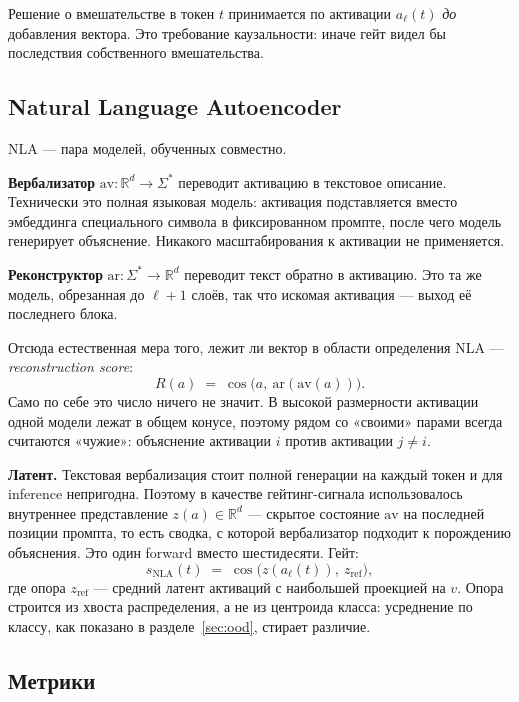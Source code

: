 \documentclass[11pt,a4paper]{article}
\begin{document}
Решение о вмешательстве в токен $t$ принимается по активации $a_\ell(t)$
\emph{до} добавления вектора. Это требование каузальности: иначе гейт видел бы
последствия собственного вмешательства.

\subsection{Natural Language Autoencoder}

NLA --- пара моделей, обученных совместно.

\textbf{Вербализатор} $\mathrm{av}:\mathbb{R}^d\to\Sigma^{*}$ переводит
активацию в текстовое описание. Технически это полная языковая модель:
активация подставляется вместо эмбеддинга специального символа в фиксированном
промпте, после чего модель генерирует объяснение. Никакого масштабирования к
активации не применяется.

\textbf{Реконструктор} $\mathrm{ar}:\Sigma^{*}\to\mathbb{R}^d$ переводит текст
обратно в активацию. Это та же модель, обрезанная до $\ell+1$ слоёв, так что
искомая активация --- выход её последнего блока.

Отсюда естественная мера того, лежит ли вектор в области определения NLA ---
\emph{reconstruction score}:
\begin{equation}
R(a) \;=\; \cos\!\big(a,\ \mathrm{ar}(\mathrm{av}(a))\big).
\label{eq:recon}
\end{equation}
Само по себе это число ничего не значит. В высокой размерности активации одной
модели лежат в общем конусе, поэтому рядом со «своими» парами всегда считаются
«чужие»: объяснение активации $i$ против активации $j\neq i$.

\textbf{Латент.} Текстовая вербализация стоит полной генерации на каждый токен
и для inference непригодна. Поэтому в качестве гейтинг-сигнала использовалось
внутреннее представление $z(a)\in\mathbb{R}^d$ --- скрытое состояние
$\mathrm{av}$ на последней позиции промпта, то есть сводка, с которой
вербализатор подходит к порождению объяснения. Это один forward вместо
шестидесяти. Гейт:
\begin{equation}
s_{\text{NLA}}(t) \;=\; \cos\!\big(z(a_\ell(t)),\ z_{\text{ref}}\big),
\label{eq:nlagate}
\end{equation}
где опора $z_{\text{ref}}$ --- средний латент активаций с наибольшей проекцией
на $v$. Опора строится из хвоста распределения, а не из центроида класса:
усреднение по классу, как показано в разделе~\ref{sec:ood}, стирает различие.

\subsection{Метрики}
\end{document}
